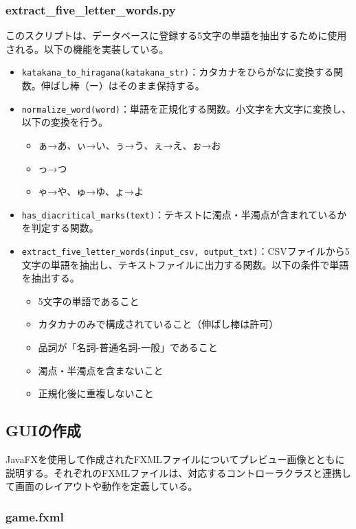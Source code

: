 \documentclass[a4j]{ujarticle}
\begin{document}
\subsubsection{extract\_five\_letter\_words.py}
このスクリプトは、データベースに登録する5文字の単語を抽出するために使用される。以下の機能を実装している。
\begin{itemize}
  \item \texttt{katakana\_to\_hiragana(katakana\_str)}：カタカナをひらがなに変換する関数。伸ばし棒（ー）はそのまま保持する。
  \item \texttt{normalize\_word(word)}：単語を正規化する関数。小文字を大文字に変換し、以下の変換を行う。
  \begin{itemize}
    \item ぁ→あ、ぃ→い、ぅ→う、ぇ→え、ぉ→お
    \item っ→つ
    \item ゃ→や、ゅ→ゆ、ょ→よ
  \end{itemize}
  \item \texttt{has\_diacritical\_marks(text)}：テキストに濁点・半濁点が含まれているかを判定する関数。
  \item \texttt{extract\_five\_letter\_words(input\_csv, output\_txt)}：CSVファイルから5文字の単語を抽出し、テキストファイルに出力する関数。以下の条件で単語を抽出する。
  \begin{itemize}
    \item 5文字の単語であること
    \item カタカナのみで構成されていること（伸ばし棒は許可）
    \item 品詞が「名詞-普通名詞-一般」であること
    \item 濁点・半濁点を含まないこと
    \item 正規化後に重複しないこと
  \end{itemize}
\end{itemize}


\subsection{GUIの作成}
JavaFXを使用して作成されたFXMLファイルについてプレビュー画像とともに説明する。それぞれのFXMLファイルは、対応するコントローラクラスと連携して画面のレイアウトや動作を定義している。

\subsubsection{game.fxml}
\end{document}

